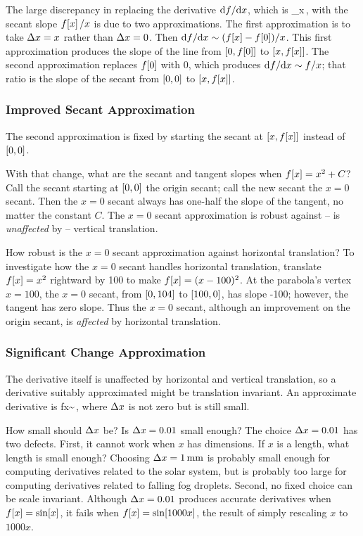 The large discrepancy in replacing the derivative $\text{d} f/\text{d} x$, which is
\beq
\lim_{\diff x}\,,
\eeq
with the secant slope $f\!\left[{x}\right]/x$ is due to two approximations. The first approximation is to take $\Delta x = x$ rather than $\Delta x = 0$. Then $\text{d} f/\text{d} x\sim (f\!\left[{x}\right] - f\!\left[{0}\right])/x$. This first approximation produces the slope of the line from $\left[{0,f\!\left[{0}\right]}\right]$ to $\left[{x,f\!\left[{x}\right]}\right]$. The second approximation replaces $f\!\left[{0}\right]$ with 0, which produces $\text{d} f/\text{d} x\sim f/x$; that ratio is the slope of the secant from $\left[{0,0}\right]$ to $\left[{x,f\!\left[{x}\right]}\right]$.


\subsubsection{Improved Secant Approximation}
The second approximation is fixed by starting the secant at $\left[{x,f\!\left[{x}\right]}\right]$ instead of $\left[{0,0}\right]$.

With that change, what are the secant and tangent slopes when $f\!\left[{x}\right] = x^2 + C$? Call the secant starting at $\left[{0,0}\right]$ the origin secant; call the new secant the $x = 0$ secant. Then the $x = 0$ secant always has one-half the slope of the tangent, no matter the constant $C$. The $x = 0$ secant approximation is robust against -- is \emph{unaffected} by -- vertical translation.

How robust is the $x = $0 secant approximation against horizontal translation? To investigate how the $x = 0$ secant handles horizontal translation, translate $f\!\left[{x}\right] = x^2$ rightward by 100 to make $f\!\left[{x}\right] = (x-100)^2$. At the parabola's vertex $x = 100$, the $x = 0$ secant, from $\left[{0,104}\right]$ to $\left[{100,0}\right]$, has slope -100; however, the tangent has zero slope. Thus the $x = 0$ secant, although an improvement on the origin secant, is \emph{affected} by horizontal translation.


\subsubsection{Significant Change Approximation}
The derivative itself is unaffected by horizontal and vertical translation, so a derivative suitably approximated might be translation invariant. An approximate derivative is
\beq
\xod fx\sim{}\,,
\eeq
where $\Delta x$ is not zero but is still small.

How small should $\Delta x$ be? Is $\Delta x = 0.01$ small enough? The choice $\Delta x = 0.01$ has two defects. First, it cannot work when $x$ has dimensions. If $x$ is a length, what length is small enough? Choosing $\Delta x = \SI{1}{mm}$ is probably small enough for computing derivatives related to the solar system, but is probably too large for computing derivatives related to falling fog droplets. Second, no fixed choice can be scale invariant. Although $\Delta x = 0.01$ produces accurate derivatives when $f\!\left[{x}\right] = \sin\!\left[{x}\right]$, it fails when $f\!\left[{x}\right] = \sin\!\left[{1000 x}\right]$, the result of simply rescaling $x$ to $1000x$.

